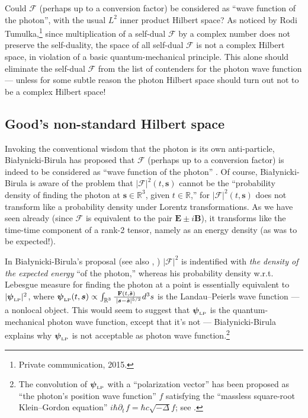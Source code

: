 \documentclass[12pt]{article}
\theoremstyle{definition}
\newcommand{\vect}[1] {\boldsymbol{{ #1}} }
\newcommand{\sV}{{\vect{s}}}            %
\newcommand{\FV}{\pmb{\mathcal{F}}}
\numberwithin{equation}{section}
\newcommand{\bB}{\mathbf{B}}
\newcommand{\bE}{\mathbf{E}}
\newcommand{\bF}{\mathbf{F}}
\newcommand{\psiLP}{{{\boldsymbol{\psi}}_{\mbox{\rm\tiny LP}}}}
\newcommand{\Rset}{{\mathbb R}}
\newcommand{\pdt}{{\partial_t^{\phantom{0}}}}
\begin{document}
 Could $\FV$ (perhaps up to a conversion factor) be considered as ``wave function of the photon'', with the usual $L^2$
inner product Hilbert space?
 {As noticed by Rodi Tumulka,\footnote{Private communication, 2015.} 
since multiplication of a self-dual $\FV$ by a complex number does not preserve the self-duality, 
the space of all self-dual $\FV$ is not a complex Hilbert space, in violation of a basic quantum-mechanical principle.
 This alone should eliminate the self-dual $\FV$ from the list of contenders for the photon wave function --- 
unless for some subtle reason the photon Hilbert space should turn out not to be a complex Hilbert space!}\vspace{-5pt}

\subsection{Good's non-standard Hilbert space}\label{sec:GOODnogood}\vspace{-5pt}

  Invoking the conventional wisdom that the photon is its own anti-particle, Bia\l{}ynicki-Birula has proposed that $\FV$ 
(perhaps up to a conversion factor) is indeed to be considered as ``wave function of the photon'' \cite{BiBiTHREE,IBBphotonREV}.
 Of course, Bia\l{}ynicki-Birula is aware of the problem that 
 $|{\FV}|^2(t,\sV)$ cannot be the ``probability density of finding the photon at $\sV\in\Rset^3$, given $t\in\Rset$,'' 
for $|{\FV}|^2(t,\sV)$ does not transform like a probability density under Lorentz transformations.
 As we have seen already (since $\FV$ is equivalent to the pair $\bE\pm i\bB$),
it transforms like the time-time component of a rank-2 tensor, namely as an energy density (as was to be expected!). 

 In Bia\l{}ynicki-Birula's proposal \cite{BiBiTHREE,IBBphotonREV} (see also \cite{IBBZBBphotonREV}, \cite{RedkovETal})
$|\FV|^2$ is indentified with \emph{the density of the expected energy} ``of the photon,'' 
whereas his probability density w.r.t. Lebesgue measure for finding the photon at a point is
essentially equivalent to $|\psiLP|^2$, where 
   $\psiLP(t,\sV) \propto \int_{\Rset^3}\frac{\!\!\bF(t,\tilde{\sV})}{\;|\sV - \tilde{\sV}|^{5/2}}d^3s$
is the Landau--Peierls wave function \cite{LandauPeierls} --- a nonlocal object. %
 This would seem to suggest that $\psiLP$ is the quantum-mechanical photon wave function, except that it's not
--- Bia\l{}ynicki-Birula explains why $\psiLP$ is not acceptable as photon wave function.\footnote{The convolution of $\psiLP$ 
   with a ``polarization vector'' has been proposed as ``the photon's position wave function'' $f$ 
satisfying the ``massless square-root Klein--Gordon equation'' $i\hbar \pdt f = \hbar c \sqrt{-\Delta} f$; see \cite{Mostafazadeh}.}
\end{document}

